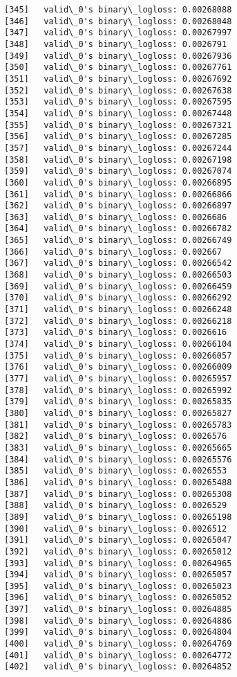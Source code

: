 \documentclass[11pt]{article}
\begin{document}
\begin{Verbatim}[commandchars=\\\{\}]
[345]	valid\_0's binary\_logloss: 0.00268088
[346]	valid\_0's binary\_logloss: 0.00268048
[347]	valid\_0's binary\_logloss: 0.00267997
[348]	valid\_0's binary\_logloss: 0.0026791
[349]	valid\_0's binary\_logloss: 0.00267936
[350]	valid\_0's binary\_logloss: 0.00267761
[351]	valid\_0's binary\_logloss: 0.00267692
[352]	valid\_0's binary\_logloss: 0.00267638
[353]	valid\_0's binary\_logloss: 0.00267595
[354]	valid\_0's binary\_logloss: 0.00267448
[355]	valid\_0's binary\_logloss: 0.00267321
[356]	valid\_0's binary\_logloss: 0.00267285
[357]	valid\_0's binary\_logloss: 0.00267244
[358]	valid\_0's binary\_logloss: 0.00267198
[359]	valid\_0's binary\_logloss: 0.00267074
[360]	valid\_0's binary\_logloss: 0.00266895
[361]	valid\_0's binary\_logloss: 0.00266866
[362]	valid\_0's binary\_logloss: 0.00266897
[363]	valid\_0's binary\_logloss: 0.0026686
[364]	valid\_0's binary\_logloss: 0.00266782
[365]	valid\_0's binary\_logloss: 0.00266749
[366]	valid\_0's binary\_logloss: 0.002667
[367]	valid\_0's binary\_logloss: 0.00266542
[368]	valid\_0's binary\_logloss: 0.00266503
[369]	valid\_0's binary\_logloss: 0.00266459
[370]	valid\_0's binary\_logloss: 0.00266292
[371]	valid\_0's binary\_logloss: 0.00266248
[372]	valid\_0's binary\_logloss: 0.00266218
[373]	valid\_0's binary\_logloss: 0.0026616
[374]	valid\_0's binary\_logloss: 0.00266104
[375]	valid\_0's binary\_logloss: 0.00266057
[376]	valid\_0's binary\_logloss: 0.00266009
[377]	valid\_0's binary\_logloss: 0.00265957
[378]	valid\_0's binary\_logloss: 0.00265992
[379]	valid\_0's binary\_logloss: 0.00265835
[380]	valid\_0's binary\_logloss: 0.00265827
[381]	valid\_0's binary\_logloss: 0.00265783
[382]	valid\_0's binary\_logloss: 0.0026576
[383]	valid\_0's binary\_logloss: 0.00265665
[384]	valid\_0's binary\_logloss: 0.00265576
[385]	valid\_0's binary\_logloss: 0.0026553
[386]	valid\_0's binary\_logloss: 0.00265488
[387]	valid\_0's binary\_logloss: 0.00265308
[388]	valid\_0's binary\_logloss: 0.0026529
[389]	valid\_0's binary\_logloss: 0.00265198
[390]	valid\_0's binary\_logloss: 0.0026512
[391]	valid\_0's binary\_logloss: 0.00265047
[392]	valid\_0's binary\_logloss: 0.00265012
[393]	valid\_0's binary\_logloss: 0.00264965
[394]	valid\_0's binary\_logloss: 0.00265057
[395]	valid\_0's binary\_logloss: 0.00265023
[396]	valid\_0's binary\_logloss: 0.00265052
[397]	valid\_0's binary\_logloss: 0.00264885
[398]	valid\_0's binary\_logloss: 0.00264886
[399]	valid\_0's binary\_logloss: 0.00264804
[400]	valid\_0's binary\_logloss: 0.00264769
[401]	valid\_0's binary\_logloss: 0.00264772
[402]	valid\_0's binary\_logloss: 0.00264852

\end{Verbatim}
\end{document}
